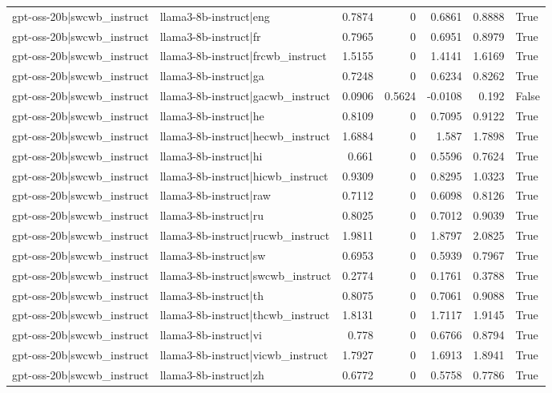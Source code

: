 \begin{table}
\begin{tabular}{l l r r r r l}
gpt-oss-20b|swcwb_instruct & llama3-8b-instruct|eng & 0.7874 & 0 & 0.6861 & 0.8888 & True \\
gpt-oss-20b|swcwb_instruct & llama3-8b-instruct|fr & 0.7965 & 0 & 0.6951 & 0.8979 & True \\
gpt-oss-20b|swcwb_instruct & llama3-8b-instruct|frcwb_instruct & 1.5155 & 0 & 1.4141 & 1.6169 & True \\
gpt-oss-20b|swcwb_instruct & llama3-8b-instruct|ga & 0.7248 & 0 & 0.6234 & 0.8262 & True \\
gpt-oss-20b|swcwb_instruct & llama3-8b-instruct|gacwb_instruct & 0.0906 & 0.5624 & -0.0108 & 0.192 & False \\
gpt-oss-20b|swcwb_instruct & llama3-8b-instruct|he & 0.8109 & 0 & 0.7095 & 0.9122 & True \\
gpt-oss-20b|swcwb_instruct & llama3-8b-instruct|hecwb_instruct & 1.6884 & 0 & 1.587 & 1.7898 & True \\
gpt-oss-20b|swcwb_instruct & llama3-8b-instruct|hi & 0.661 & 0 & 0.5596 & 0.7624 & True \\
gpt-oss-20b|swcwb_instruct & llama3-8b-instruct|hicwb_instruct & 0.9309 & 0 & 0.8295 & 1.0323 & True \\
gpt-oss-20b|swcwb_instruct & llama3-8b-instruct|raw & 0.7112 & 0 & 0.6098 & 0.8126 & True \\
gpt-oss-20b|swcwb_instruct & llama3-8b-instruct|ru & 0.8025 & 0 & 0.7012 & 0.9039 & True \\
gpt-oss-20b|swcwb_instruct & llama3-8b-instruct|rucwb_instruct & 1.9811 & 0 & 1.8797 & 2.0825 & True \\
gpt-oss-20b|swcwb_instruct & llama3-8b-instruct|sw & 0.6953 & 0 & 0.5939 & 0.7967 & True \\
gpt-oss-20b|swcwb_instruct & llama3-8b-instruct|swcwb_instruct & 0.2774 & 0 & 0.1761 & 0.3788 & True \\
gpt-oss-20b|swcwb_instruct & llama3-8b-instruct|th & 0.8075 & 0 & 0.7061 & 0.9088 & True \\
gpt-oss-20b|swcwb_instruct & llama3-8b-instruct|thcwb_instruct & 1.8131 & 0 & 1.7117 & 1.9145 & True \\
gpt-oss-20b|swcwb_instruct & llama3-8b-instruct|vi & 0.778 & 0 & 0.6766 & 0.8794 & True \\
gpt-oss-20b|swcwb_instruct & llama3-8b-instruct|vicwb_instruct & 1.7927 & 0 & 1.6913 & 1.8941 & True \\
gpt-oss-20b|swcwb_instruct & llama3-8b-instruct|zh & 0.6772 & 0 & 0.5758 & 0.7786 & True \\

\end{tabular}
\end{table}
